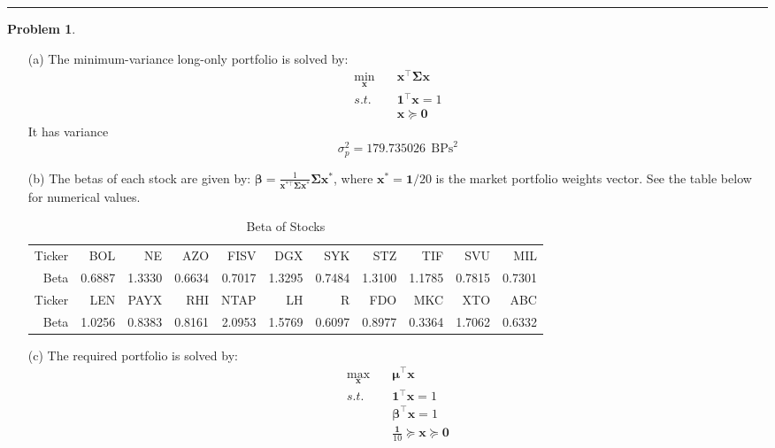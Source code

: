 \documentclass[a4paper, 8pt]{article}
\theoremstyle{definition}
\newtheorem{problem}{Problem}
\theoremstyle{hSol}
\begin{document}
\noindent\rule{16cm}{0.4pt}
\begin{problem} \begin{itemize}
	\item[(a)] The minimum-variance long-only portfolio is solved by:
	\begin{equation}
		\begin{split}
			\underset{\bm{x}}{\min}\quad& \bm{x}^{\top} \bm{\Sigma} \bm{x}\\
			s.t. \quad & \bm{1}^{\top} \bm{x} = 1\\
			& \bm{x} \succeq \bm{0}
		\end{split}
	\end{equation}
	It has variance
	\begin{equation}
		\sigma_p^2 = 179.735026~~\text{BPs}^2
	\end{equation}
	\item[(b)] The betas of each stock are given by: $\bm{\beta} = \frac{1}{\bm{x}^{*\top} \bm{\Sigma}\bm{x}^*}\bm{\Sigma}\bm{x}^*$, where $\bm{x}^* = \bm{1}/20$ is the market portfolio weights vector. See the table below for numerical values.
	 \begin{table}[H]
\centering
\begin{tabular}{rrrrrrrrrrr}
\toprule
Ticker & BOL & NE & AZO & FISV & DGX & SYK & STZ & TIF & SVU & MIL\\
Beta & 0.6887 & 1.3330 & 0.6634 & 0.7017 & 1.3295 & 0.7484 & 1.3100 & 1.1785 & 0.7815 & 0.7301 \\
\midrule
Ticker & LEN & PAYX & RHI & NTAP & LH & R& FDO & MKC & XTO & ABC\\
Beta & 1.0256 & 0.8383 & 0.8161 & 2.0953 & 1.5769 & 0.6097 & 0.8977 & 0.3364 & 1.7062 & 0.6332\\
\bottomrule
\end{tabular}
\caption{Beta of Stocks}
\end{table}
  \item[(c)] The required portfolio is solved by:
	\begin{equation}
		\begin{split}
			\underset{\bm{x}}{\max}\quad&  \bm{\mu}^{\top} \bm{x}\\
			s.t. \quad & \bm{1}^{\top} \bm{x} = 1\\
			& \bm{\beta}^{\top} \bm{x} = 1\\
			& \frac{\bm{1}}{10} \succeq \bm{x} \succeq \bm{0}
		\end{split}
	\end{equation}

\end{itemize}
\end{problem}
\end{document}

